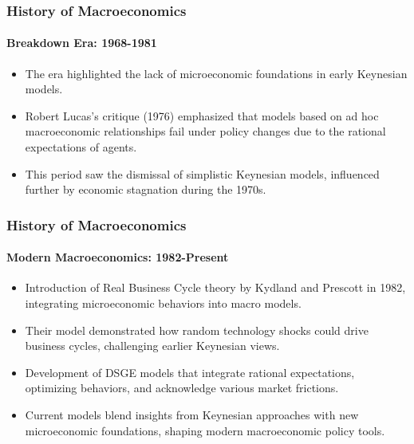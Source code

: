 \documentclass{beamer}
\begin{document}
        \begin{frame}
            \frametitle{History of Macroeconomics}
            \framesubtitle{Breakdown Era: 1968-1981}
                \begin{itemize}
                    \item The era highlighted the lack of microeconomic foundations in early Keynesian models.
                    \item Robert Lucas's critique (1976) emphasized that models based on ad hoc macroeconomic relationships fail under policy changes due to the rational expectations of agents.
                    \item This period saw the dismissal of simplistic Keynesian models, influenced further by economic stagnation during the 1970s.
                \end{itemize}
            \end{frame}
            
            \begin{frame}
                \frametitle{History of Macroeconomics}
                \framesubtitle{Modern Macroeconomics: 1982-Present}
                    \begin{itemize}
                        \item Introduction of Real Business Cycle theory by Kydland and Prescott in 1982, integrating microeconomic behaviors into macro models.
                        \item Their model demonstrated how random technology shocks could drive business cycles, challenging earlier Keynesian views.
                        \item Development of DSGE models that integrate rational expectations, optimizing behaviors, and acknowledge various market frictions.
                        \item Current models blend insights from Keynesian approaches with new microeconomic foundations, shaping modern macroeconomic policy tools.
                    \end{itemize}
            \end{frame}
                
\end{document}
